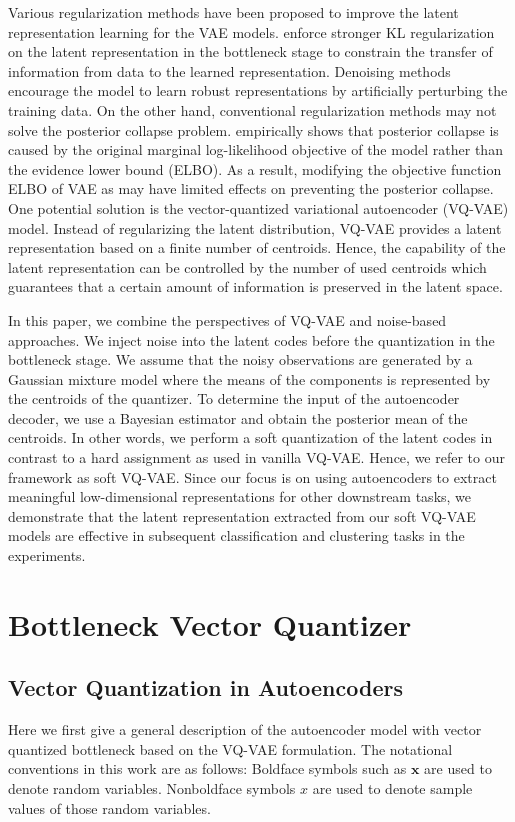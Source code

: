 \documentclass[letterpaper]{article} %
\begin{document}
 Various regularization methods have been proposed to improve the latent representation learning for the VAE models. \cite{Higgins:17:iclr}\cite{burgess2018understanding} enforce stronger KL regularization on the latent representation in the bottleneck stage to constrain the transfer of information from data to the learned representation. Denoising methods \cite{8253482}\cite{NIPS2018_7692}\cite{bengio:AAAI:17} encourage the model to learn robust representations by artificially perturbing the training data. On the other hand, conventional regularization methods may not solve the posterior collapse problem. \cite{Lucas2019} empirically shows that posterior collapse is caused by the original marginal log-likelihood objective of the model rather than the evidence lower bound (ELBO). As a result, modifying the objective function ELBO of VAE as \cite{Higgins:17:iclr}\cite{burgess2018understanding} may have limited effects on preventing the posterior collapse. One potential solution is the vector-quantized variational autoencoder (VQ-VAE) \cite{oord:17:nips} model. Instead of regularizing the latent distribution, VQ-VAE provides a latent representation based on a finite number of centroids. Hence, the capability of the latent representation can be controlled by the number of used centroids which guarantees that a certain amount of information is preserved in the latent space.

In this paper, we combine the perspectives of VQ-VAE and noise-based approaches. We inject noise into the latent codes before the quantization in the bottleneck stage. We assume that the noisy observations are generated by a Gaussian mixture model where the means of the components is represented by the centroids of the quantizer. To determine the input of the autoencoder decoder, we use a Bayesian estimator and obtain the posterior mean of the centroids. In other words, we perform a soft quantization of the latent codes in contrast to a hard assignment as used in vanilla VQ-VAE. Hence, we refer to our framework as soft VQ-VAE. Since our focus is on using autoencoders to extract meaningful low-dimensional representations for other downstream tasks, we demonstrate that the latent representation extracted from our soft VQ-VAE models are effective in subsequent classification and clustering tasks in the experiments.
\section{Bottleneck Vector Quantizer}
\label{quantization}
\subsection{Vector Quantization in Autoencoders}
\label{subsec:vq-vae}
 Here we first give a general description of the autoencoder model with vector quantized bottleneck based on the VQ-VAE formulation. The notational conventions in this work are as follows: Boldface symbols such as $\mathbf{x}$ are used to denote random variables. Nonboldface symbols $x$ are used to denote sample values of those random variables.
\end{document}
